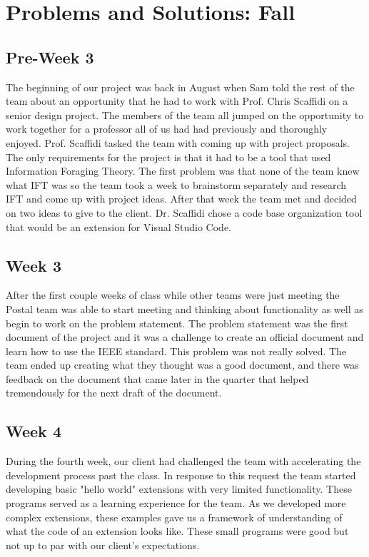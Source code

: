 \documentclass[letterpaper,10pt,titlepage,draftclsnofoot,onecolumn,onesided] {IEEEtran}
\begin{document}
\section{Problems and Solutions: Fall}
	\subsection{Pre-Week 3}
	The beginning of our project was back in August when Sam told the rest of the team about an opportunity that he had to work with Prof. Chris Scaffidi on a senior design project. 
	The members of the team all jumped on the opportunity to work together for a professor all of us had had previously and thoroughly enjoyed.
	Prof. Scaffidi tasked the team with coming up with project proposals.
	The only requirements for the project is that it had to be a tool that used Information Foraging Theory.
	The first problem was that none of the team knew what IFT was so the team took a week to brainstorm separately and research IFT and come up with project ideas.
	After that week the team met and decided on two ideas to give to the client.
	Dr. Scaffidi chose a code base organization tool that would be an extension for Visual Studio Code.
	
	\subsection{Week 3}
	After the first couple weeks of class while other teams were just meeting the Postal team was able to start meeting and thinking about functionality as well as begin to work on the problem statement.
	The problem statement was the first document of the project and it was a challenge to create an official document and learn how to use the IEEE standard. 
	This problem was not really solved.
	The team ended up creating what they thought was a good document, and there was feedback on the document that came later in the quarter that helped tremendously for the next draft of the document.
	
	\subsection{Week 4}
	During the fourth week, our client had challenged the team with accelerating the development process past the class.
	In response to this request the team started developing basic "hello world" extensions with very limited functionality.
	These programs served as a learning experience for the team. As we developed more complex extensions, these examples gave us a framework of understanding of what the code of an extension looks like.
	These small programs were good but not up to par with our client's expectations.	
	
\end{document}
